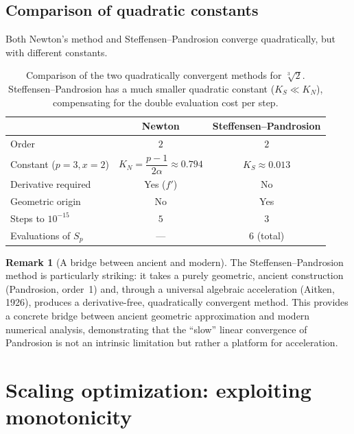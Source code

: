 \documentclass[11pt,a4paper]{article}
\theoremstyle{definition}
\newtheorem{remark}{Remark}[section]
\newcommand{\cbrt}[1]{\sqrt[3]{#1}}
\begin{document}
\subsection{Comparison of quadratic constants}

Both Newton's method and Steffensen--Pandrosion converge quadratically, but with different constants.

\begin{table}[h]
\centering
\renewcommand{\arraystretch}{1.3}
\begin{tabular}{lcc}
\toprule
& \textbf{Newton} & \textbf{Steffensen--Pandrosion} \\
\midrule
Order & $2$ & $2$ \\
Constant ($p\!=\!3, x\!=\!2$) & $K_N = \dfrac{p-1}{2\alpha} \approx 0.794$ & $K_S \approx 0.013$ \\
Derivative required & Yes ($f'$) & No \\
Geometric origin & No & Yes \\
Steps to $10^{-15}$ & $5$ & $3$ \\
Evaluations of $S_p$ & --- & $6$ (total) \\
\bottomrule
\end{tabular}
\caption{Comparison of the two quadratically convergent methods for $\cbrt{2}$. Steffensen--Pandrosion has a much smaller quadratic constant ($K_S \ll K_N$), compensating for the double evaluation cost per step.}
\end{table}

\begin{remark}[A bridge between ancient and modern]
The Steffensen--Pandrosion method is particularly striking: it takes a purely geometric, ancient construction (Pandrosion, order~1) and, through a universal algebraic acceleration (Aitken, 1926), produces a derivative-free, quadratically convergent method.  This provides a concrete bridge between ancient geometric approximation and modern numerical analysis, demonstrating that the ``slow'' linear convergence of Pandrosion is not an intrinsic limitation but rather a platform for acceleration.
\end{remark}

\section{Scaling optimization: exploiting monotonicity}
\label{sec:scaling}
\end{document}
